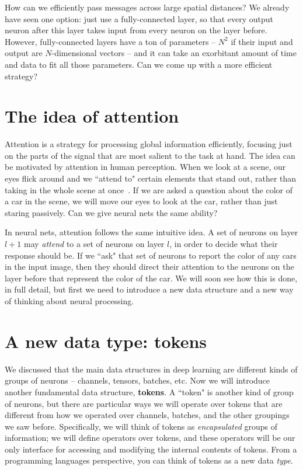How can we efficiently pass messages across large spatial distances? We already have seen one option: just use a fully-connected layer, so that every output neuron after this layer takes input from every neuron on the layer before. However, fully-connected layers have a ton of parameters -- $N^2$ if their input and output are $N$-dimensional vectors -- and it can take an exorbitant amount of time and data to fit all those parameters. Can we come up with a more efficient strategy?


\section{The idea of attention}
Attention is a strategy for processing global information efficiently, focusing just on the parts of the signal that are most salient to the task at hand. The idea can be motivated by attention in human perception. When we look at a scene, our eyes flick around and we ``attend to" certain elements that stand out, rather than taking in the whole scene at once~\cite{wolfe2000visual}. If we are asked a question about the color of a car in the scene, we will move our eyes to look at the car, rather than just staring passively. Can we give neural nets the same ability?

In neural nets, attention follows the same intuitive idea. A set of neurons on layer $l+1$ may \textit{attend} to a set of neurons on layer $l$, in order to decide what their response should be. If we ``ask" that set of neurons to report the color of any cars in the input image, then they should direct their attention to the neurons on the layer before that represent the color of the car. We will soon see how this is done, in full detail, but first we need to introduce a new data structure and a new way of thinking about neural processing. 

\section{A new data type: tokens}
We discussed that the main data structures in deep learning are different kinds of groups of neurons -- channels, tensors, batches, etc. Now we will introduce another fundamental data structure, {\bf tokens}. A ``token" is another kind of group of neurons, but there are particular ways we will operate over tokens that are different from how we operated over channels, batches, and the other groupings we saw before. Specifically,  we will think of tokens as \textit{encapsulated} groups of information; we will define operators over tokens, and these operators will be our only interface for accessing and modifying the internal contents of tokens. From a programming languages perspective, you can think of tokens as a new data \textit{type}.

